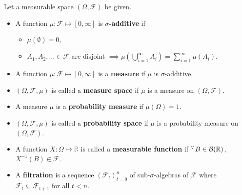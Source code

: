 \documentclass[10pt]{article}
\theoremstyle{definition}
\newenvironment{definition*}[1]{%
  \IfBlankTF{#1}
    {\renewcommand{\themanualdefinitioninner}{\unskip}}
    {\renewcommand\themanualdefinitioninner{#1}}%
  \manualdefinitioninner
}{\endmanualdefinitioninner}
\begin{document}
\begin{definition*}{}Let a measurable space $(\Omega, \mathcal{F})$ be given.
    \leavevmode
    \begin{itemize}
        \item A function $\mu : \mathcal{F} \mapsto [0, \infty]$ is \textbf{$\sigma$-additive} if 
        \begin{itemize}
            \item[(1)] $\mu(\emptyset) = 0$,
            \item[(2)] $A_1, A_2, \ldots \in \mathcal{F}$ are disjoint $\implies \mu\left( \bigcup_{i=1}^{\infty} A_i \right) = \sum_{i=1}^{\infty} \mu(A_i)$.
        \end{itemize}
        \item A function $\mu : \mathcal{F} \mapsto [0, \infty]$ is a \textbf{measure} if $\mu$ is $\sigma$-additive.
        \item $(\Omega, \mathcal{F}, \mu)$ is called a \textbf{measure space} if $\mu$ is a measure on $(\Omega, \mathcal{F})$.
        \item A measure $\mu$ is a \textbf{probability measure} if $\mu(\Omega) = 1$.
        \item $(\Omega, \mathcal{F}, \mu)$ is called a \textbf{probability space} if $\mu$ is a probability measure on $(\Omega, \mathcal{F})$.
        \item A function $X : \Omega \mapsto \mathbb{R}$ is called a \textbf{measurable function} if $^\forall \hspace{0.1em} B \in \mathcal{B}(\mathbb{R})$, $X^{-1}(B) \in \mathcal{F}$.
        \item A \textbf{filtration} is a sequence $(\mathcal{F}_t)_{t=0}^n$ of sub-$\sigma$-algebras of $\mathcal{F}$ where $\mathcal{F}_t \subseteq \mathcal{F}_{t+1}$ for all $t<n$.
    \end{itemize}
\end{definition*}
\end{document}
